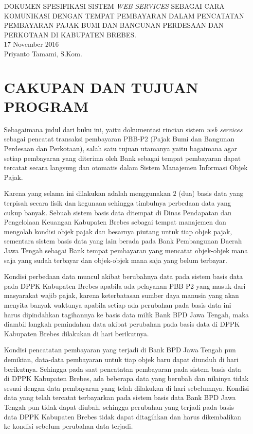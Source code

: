 \documentclass[pdftex,12pt, oneside]{article}
\begin{document}
\sloppy

\begin{center}
{\large DOKUMEN SPESIFIKASI SISTEM \textit{WEB SERVICES} SEBAGAI CARA KOMUNIKASI DENGAN TEMPAT PEMBAYARAN DALAM PENCATATAN PEMBAYARAN PAJAK BUMI DAN BANGUNAN PERDESAAN DAN PERKOTAAN DI KABUPATEN BREBES.}
\\[1cm]
17 November 2016\\
Priyanto Tamami, S.Kom.
\end{center}

\section{CAKUPAN DAN TUJUAN PROGRAM}

Sebagaimana judul dari buku ini, yaitu dokumentasi rincian sistem \textit{web services} sebagai pencatat transaksi pembayaran PBB-P2 (Pajak Bumi dan Bangunan Perdesaan dan Perkotaan), salah satu tujuan utamanya yaitu bagaimana agar setiap pembayaran yang diterima oleh Bank sebagai tempat pembayaran dapat tercatat secara langsung dan otomatis dalam Sistem Manajemen Informasi Objek Pajak.

Karena yang selama ini dilakukan adalah menggunakan 2 (dua) basis data yang terpisah secara fisik dan kegunaan sehingga timbulnya perbedaan data yang cukup banyak. Sebuah sistem basis data ditempat di Dinas Pendapatan dan Pengelolaan Keuangan Kabupaten Brebes sebagai tempat manajemen dan mengolah kondisi objek pajak dan besarnya piutang untuk tiap objek pajak, sementara sistem basis data yang lain berada pada Bank Pembangunan Daerah Jawa Tengah sebagai Bank tempat pembayaran yang mencatat objek-objek mana saja yang sudah terbayar dan objek-objek mana saja yang belum terbayar.

Kondisi perbedaan data muncul akibat berubahnya data pada sistem basis data pada DPPK Kabupaten Brebes apabila ada pelayanan PBB-P2 yang masuk dari masyarakat wajib pajak, karena keterbatasan sumber daya manusia yang akan menyita banyak waktunya apabila setiap ada perubahan pada basis data ini harus dipindahkan tagihannya ke basis data milik Bank BPD Jawa Tengah, maka diambil langkah pemindahan data akibat perubahan pada basis data di DPPK Kabupaten Brebes dilakukan di hari berikutnya.

Kondisi pencatatan pembayaran yang terjadi di Bank BPD Jawa Tengah pun demikian, data-data pembayaran untuk tiap objek baru dapat diunduh di hari berikutnya. Sehingga pada saat pencatatan pembayaran pada sistem basis data di DPPK Kabupaten Brebes, ada beberapa data yang berubah dan nilainya tidak sesuai dengan data pembayaran yang telah dilakukan di hari sebelumnya. Kondisi data yang telah tercatat terbayarkan pada sistem basis data Bank BPD Jawa Tengah pun tidak dapat diubah, sehingga perubahan yang terjadi pada basis data DPPK Kabupaten Brebes tidak dapat ditagihkan dan harus dikembalikan ke kondisi sebelum perubahan data terjadi.
\end{document}
